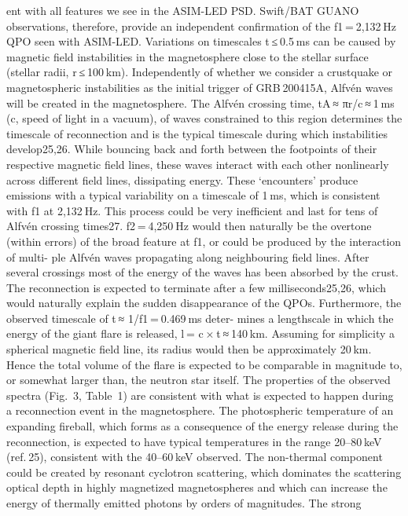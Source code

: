 ent with all features we see in the ASIM-LED PSD. Swift/BAT GUANO
observations, therefore, provide an independent confirmation of the
f1 = 2,132 Hz QPO seen with ASIM-LED.
Variations on timescales t ≤ 0.5 ms can be caused by magnetic field
instabilities in the magnetosphere close to the stellar surface (stellar
radii, r ≤ 100 km). Independently of whether we consider a crustquake
or magnetospheric instabilities as the initial trigger of GRB 200415A,
Alfvén waves will be created in the magnetosphere. The Alfvén crossing
time, tA ≈ πr/c ≈ 1 ms (c, speed of light in a vacuum), of waves constrained
to this region determines the timescale of reconnection and is the typical
timescale during which instabilities develop25,26. While bouncing back and
forth between the footpoints of their respective magnetic field lines, these
waves interact with each other nonlinearly across different field lines,
dissipating energy. These ‘encounters’ produce emissions with a typical
variability on a timescale of 1 ms, which is consistent with f1 at 2,132 Hz.
This process could be very inefficient and last for tens of Alfvén crossing
times27. f2 = 4,250 Hz would then naturally be the overtone (within errors)
of the broad feature at f1, or could be produced by the interaction of multi-
ple Alfvén waves propagating along neighbouring field lines. After several
crossings most of the energy of the waves has been absorbed by the crust.
The reconnection is expected to terminate after a few milliseconds25,26,
which would naturally explain the sudden disappearance of the QPOs.
Furthermore, the observed timescale of t ≈ 1/f1 = 0.469 ms deter-
mines a lengthscale in which the energy of the giant flare is released,
l = c × t ≈ 140 km. Assuming for simplicity a spherical magnetic field
line, its radius would then be approximately 20 km. Hence the total
volume of the flare is expected to be comparable in magnitude to, or
somewhat larger than, the neutron star itself.
The properties of the observed spectra (Fig. 3, Table 1) are consistent
with what is expected to happen during a reconnection event in the
magnetosphere. The photospheric temperature of an expanding
fireball, which forms as a consequence of the energy release during
the reconnection, is expected to have typical temperatures in the
range 20–80 keV (ref. 25), consistent with the 40–60 keV observed.
The non-thermal component could be created by resonant cyclotron
scattering, which dominates the scattering optical depth in highly
magnetized magnetospheres and which can increase the energy
of thermally emitted photons by orders of magnitudes. The strong
